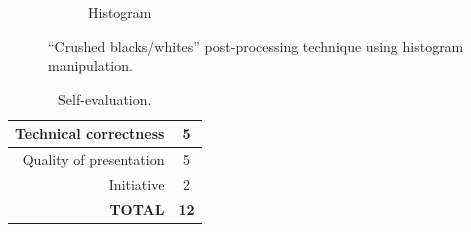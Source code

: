 \documentclass[12pt,a4paper]{article}
\begin{document}
\begin{figure}
\begin{subfigure}[h!]{0.33\textwidth}
		\caption{Histogram}
		\label{fig:crush-hist}
	\end{subfigure}
	\caption{``Crushed blacks/whites'' post-processing technique using histogram manipulation.}
	\label{fig:crushed-blacks}
\end{figure}

\begin{table}[!htb]
	\centering
	\caption{Self-evaluation.}
	\begin{tabular}{|r|c|}
		\hline
		Technical correctness & 5 \\ \hline
		Quality of presentation & 5 \\ \hline
		Initiative & 2 \\ \hline
		\textbf{TOTAL} & \textbf{12} \\ \hline
	\end{tabular}
	\label{tab:self-eval}
\end{table}



\end{document}
